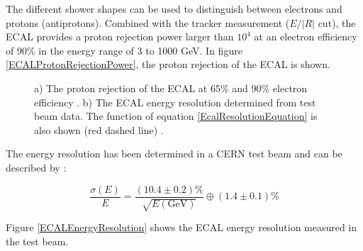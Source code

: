 The different shower shapes can be used to distinguish between electrons and protons (antiprotons). Combined with the tracker measurement ($E/|R|$ cut), the ECAL provides a proton rejection power larger than $10^4$ at an electron efficiency of 90\% in the energy range of 3 to 1000 GeV. In figure \ref{ECALProtonRejectionPower}, the proton rejection of the ECAL is shown. \par


\begin{figure}[H] 
\centering   
{}    
\caption[The ECAL rejection power and energy resolution.]{a) The proton rejection of the ECAL at 65\% and 90\% electron efficiency \cite{AMSWebside}. b) The ECAL energy resolution determined from test beam data. The function of equation \ref{EcalResolutionEquation} is also shown (red dashed line) \cite{ECALResolution}.}
\end{figure}

The energy resolution has been determined in a CERN test beam \cite{ECALBeamTest} and can be described by \cite{ECALResolution}: 

\begin{equation}
\frac{\sigma (E)}{E} = \frac{(10.4 \pm 0.2) \%}{\sqrt{E(\mathrm{GeV})}}  \oplus (1.4 \pm 0.1) \%
\label{EcalResolutionEquation}
\end{equation}

Figure \ref{ECALEnergyResolution} shows the ECAL energy resolution measured in the test beam.


